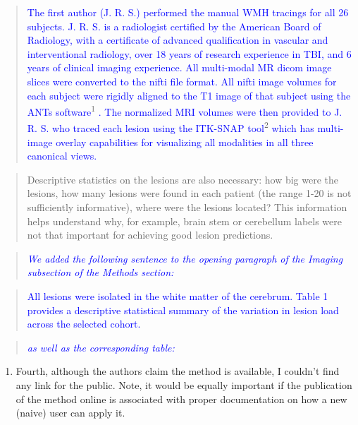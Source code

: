 \documentclass[12pt,]{article}
\providecommand{\tightlist}{%
  \setlength{\itemsep}{0pt}\setlength{\parskip}{0pt}}
\begin{document}
\begin{quote}
\textcolor{blue}{The first author (J. R. S.) performed the manual WMH tracings for all 26  subjects.  J. R. S. is a radiologist certified by the American Board of Radiology, with a certificate of advanced qualification in vascular and interventional radiology, over 18 years of research experience in TBI, and 6 years of clinical imaging experience.  All multi-modal MR dicom image slices were converted to the nifti file format. All nifti image volumes for each subject were rigidly aligned to the T1 image of that subject using the ANTs software}\textsuperscript{1}
\textcolor{blue}{.  The normalized MRI volumes were then provided to J. R. S. who traced each lesion using the ITK-SNAP tool}\textsuperscript{2}
\textcolor{blue}{ which has multi-image overlay capabilities for visualizing all modalities in all three canonical views.}
\end{quote}

\begin{quote}
Descriptive statistics on the lesions are also necessary: how big were
the lesions, how many lesions were found in each patient (the range 1-20
is not sufficiently informative), where were the lesions located? This
information helps understand why, for example, brain stem or cerebellum
labels were not that important for achieving good lesion predictions.
\end{quote}

\begin{quote}
\emph{\textcolor{blue}{We added the following sentence to the opening paragraph of the
Imaging subsection of the Methods section:}}
\end{quote}

\begin{quote}
\textcolor{blue}{All lesions were isolated in the white matter of the cerebrum.
Table 1 provides a descriptive statistical summary of the variation in lesion load across the selected cohort.}
\end{quote}

\begin{quote}
\emph{\textcolor{blue}{as well as the corresponding table:}}
\end{quote}



\clearpage

\begin{enumerate}
\def\labelenumi{\arabic{enumi}.}
\setcounter{enumi}{3}
\tightlist
\item
  Fourth, although the authors claim the method is available, I couldn't
  find any link for the public. Note, it would be equally important if
  the publication of the method online is associated with proper
  documentation on how a new (naive) user can apply it.
\end{enumerate}
\end{document}
